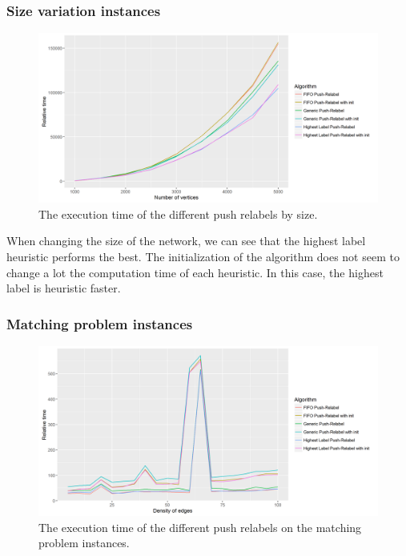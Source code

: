\subsubsection{Size variation instances}
\begin{figure}[H]
\begin{center}
\includegraphics[scale=0.5]{images/meansizepr.png}
\caption{The execution time of the different push relabels by size.}
\label{fig:mean_size_pr}
\end{center}
\end{figure}

When changing the size of the network, we can see that the highest label heuristic performs the best. The initialization of the algorithm does not seem to change a lot the computation time of each heuristic. In this case, the highest label is heuristic faster.


\subsubsection{Matching problem instances}
\begin{figure}[H]
\begin{center}
\includegraphics[scale=0.5]{images/meanmatchingpr.png}
\caption{The execution time of the different push relabels on the matching problem instances.}
\label{fig:mean_matching_pr}
\end{center}
\end{figure}

